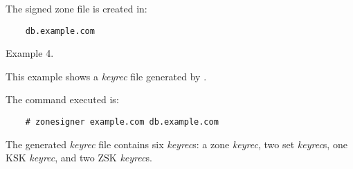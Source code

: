 The signed zone file is created in:

\begin{verbatim}
    db.example.com
\end{verbatim}

Example 4.

This example shows a {\it keyrec} file generated by .

The command executed is:

\begin{verbatim}
    # zonesigner example.com db.example.com
\end{verbatim}

The generated {\it keyrec} file contains six {\it keyrec}s:  a zone
{\it keyrec}, two set {\it keyrec}s, one KSK {\it keyrec}, and two ZSK
{\it keyrec}s.


